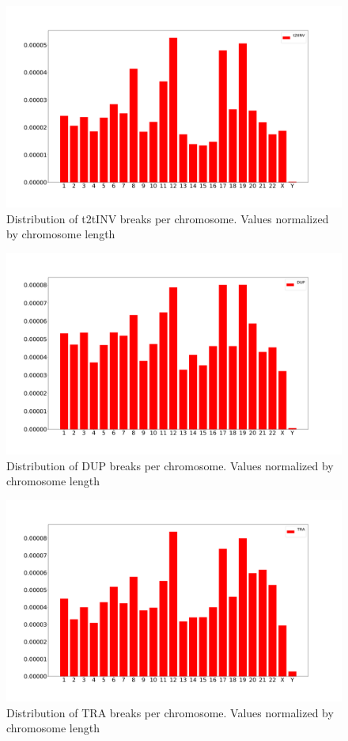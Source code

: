 \documentclass[a4paper,10pt]{article}
\begin{document}
\begin{figure}[H]
\includegraphics[scale=0.2]{figures/t2tINV_Break_distribution_normalized.pdf}
\caption{Distribution of t2tINV breaks per chromosome. Values normalized by chromosome length}
\end{figure}

\begin{figure}[H]
\includegraphics[scale=0.2]{figures/DUP_Break_distribution_normalized.pdf}
\caption{Distribution of DUP breaks per chromosome. Values normalized by chromosome length}
\end{figure}

\begin{figure}[H]
\includegraphics[scale=0.2]{figures/TRA_Break_distribution_normalized.pdf}
\caption{Distribution of TRA breaks per chromosome. Values normalized by chromosome length}
\end{figure}
\end{document}
